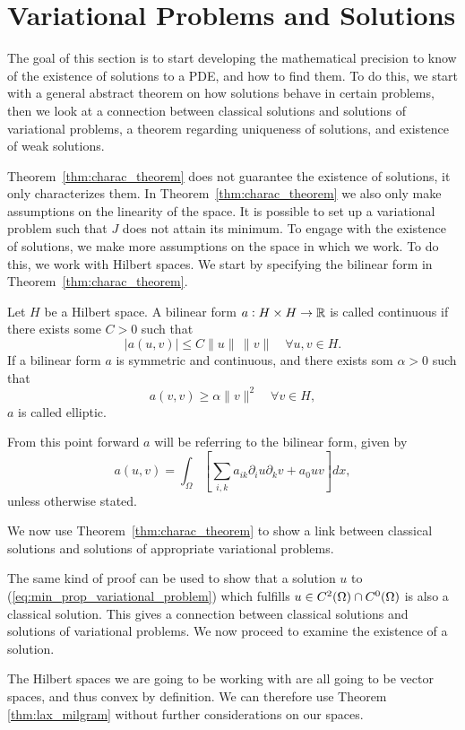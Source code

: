 \section{Variational Problems and Solutions}
The goal of this section is to start developing the mathematical 
precision to know of the existence of solutions to a PDE, and how to find 
them. 
To do this, we start with a general abstract theorem on how solutions 
behave in certain problems, then we look at a connection between 
classical solutions and solutions of variational problems, a 
theorem regarding uniqueness of solutions, and existence of 
weak solutions.


Theorem~\ref{thm:charac_theorem} does not guarantee the existence 
of solutions, it only characterizes them. In Theorem~\ref{thm:charac_theorem} we 
also only make assumptions on the linearity of the space. 
It is possible to set up a variational problem such that $J$ does 
not attain its minimum.
To engage with the existence of solutions, we make more assumptions on 
the space in which we work. To do this, we work with Hilbert spaces. 
We start by specifying the bilinear form in Theorem~\ref{thm:charac_theorem}.
\begin{defn}{\quad}
   Let $H$ be a Hilbert space. A bilinear form $a : H \times H \to \mathbb{R}$ is 
   called continuous if there exists some $C > 0$ such that 
   \begin{equation}
    |a(u,v)| \leq C \|u\|\, \|v\| \quad \forall u,v \in H.
   \end{equation} 
   If a bilinear form $a$ is symmetric and continuous, and there exists som $\alpha >0$ such that 
   \begin{equation*}\label{eq:elliptic}
    a(v,v) \geq \alpha \|v\|^2 \quad \forall v \in H,
   \end{equation*}
   $a$ is called elliptic.
 \end{defn}
From this point forward $a$ will be referring to the bilinear form, given by
\begin{equation}
   a(u,v) = \int_\Omega \left[\sum_{i,k} a_{ik}\partial_iu\partial_kv+a_0uv\right]dx,
\end{equation}
unless otherwise stated.

We now use Theorem~\ref{thm:charac_theorem} to show a link between classical 
solutions and solutions of appropriate variational problems.

The same kind of proof can be used to show that a solution $u$ to 
(\ref{eq:min_prop_variational_problem}) which fulfills 
$u\in C^2(\Omega) \cap C^0(\Omega)$ is also a classical solution. 
This gives a connection between classical solutions and solutions of 
variational problems. We now proceed to examine the existence of a 
solution.

The Hilbert spaces we are going to be working with are all going to be 
vector spaces, and thus convex by definition. 
We can therefore use Theorem \ref{thm:lax_milgram} without further considerations 
on our spaces.


